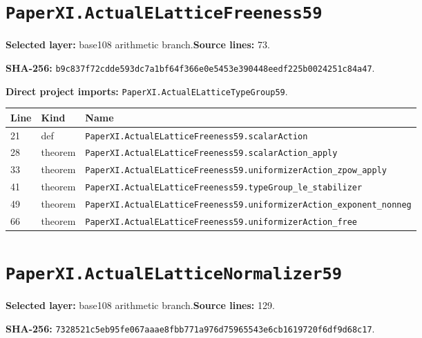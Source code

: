 \documentclass[10pt,oneside]{book}
\begin{document}
\section{\texorpdfstring{\nolinkurl{PaperXI.ActualELatticeFreeness59}}{PaperXI.ActualELatticeFreeness59}}\label{module:PaperXI.ActualELatticeFreeness59}

\textbf{Selected layer:} base108 arithmetic branch.\quad\textbf{Source lines:} 73.\par\textbf{SHA-256:} {\scriptsize\nolinkurl{b9c837f72cdde593dc7a1bf64f366e0e5453e390448eedf225b0024251c84a47}}.


\textbf{Direct project imports:} \nolinkurl{PaperXI.ActualELatticeTypeGroup59}.

\begin{longtable}{@{}p{}p{}p{}@{}}\toprule Line&Kind&Name\\\midrule\endhead

21&def&\nolinkurl{PaperXI.ActualELatticeFreeness59.scalarAction}\\

28&theorem&\nolinkurl{PaperXI.ActualELatticeFreeness59.scalarAction_apply}\\

33&theorem&\nolinkurl{PaperXI.ActualELatticeFreeness59.uniformizerAction_zpow_apply}\\

41&theorem&\nolinkurl{PaperXI.ActualELatticeFreeness59.typeGroup_le_stabilizer}\\

49&theorem&\nolinkurl{PaperXI.ActualELatticeFreeness59.uniformizerAction_exponent_nonneg}\\

66&theorem&\nolinkurl{PaperXI.ActualELatticeFreeness59.uniformizerAction_free}\\

\bottomrule\end{longtable}

\section{\texorpdfstring{\nolinkurl{PaperXI.ActualELatticeNormalizer59}}{PaperXI.ActualELatticeNormalizer59}}\label{module:PaperXI.ActualELatticeNormalizer59}

\textbf{Selected layer:} base108 arithmetic branch.\quad\textbf{Source lines:} 129.\par\textbf{SHA-256:} {\scriptsize\nolinkurl{7328521c5eb95fe067aaae8fbb771a976d75965543e6cb1619720f6df9d68c17}}.
\end{document}
